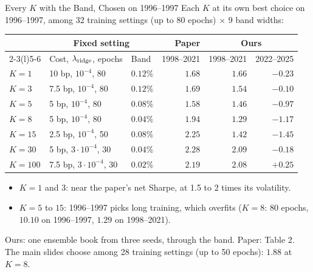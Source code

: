 \documentclass[11pt]{beamer}
\newcommand{\src}[1]{%
  \par\vfill
  {\fontsize{6.4}{7.6}\selectfont\color{Muted}#1\par}
}
\renewcommand{\src}[1]{%
  \par\vfill
  {\fontsize{6.4}{7.6}\selectfont#1\par}
}
\begin{document}
\begin{frame}{Every $K$ with the Band, Chosen on 1996--1997}
\small
Each $K$ at its own best choice on 1996--1997, among 32 training settings (up to 80 epochs) $\times$ 9 band widths:
\begin{center}
\setlength{\tabcolsep}{4pt}
\begin{tabular}{@{}lllrrr@{}}
\toprule
 & \multicolumn{2}{c}{Fixed setting} & Paper & \multicolumn{2}{c}{Ours}\\
\cmidrule(lr){2-3}\cmidrule(l){5-6}
 & Cost, $\lambda_{\rm ridge}$, epochs & Band & 1998--2021 & 1998--2021 & 2022--2025\\
\midrule
$K=1$ & 10 bp, $10^{-4}$, 80 & $0.12\%$ & $1.68$ & $1.66$ & $-0.23$\\
$K=3$ & 7.5 bp, $10^{-4}$, 80 & $0.12\%$ & $1.69$ & $1.54$ & $-0.10$\\
$K=5$ & 5 bp, $10^{-4}$, 80 & $0.08\%$ & $1.58$ & $1.46$ & $-0.97$\\
$K=8$ & 5 bp, $10^{-4}$, 80 & $0.04\%$ & $1.94$ & $1.29$ & $-1.17$\\
$K=15$ & 2.5 bp, $10^{-4}$, 50 & $0.08\%$ & $2.25$ & $1.42$ & $-1.45$\\
$K=30$ & 5 bp, $3\cdot10^{-4}$, 30 & $0.04\%$ & $2.28$ & $2.09$ & $-0.18$\\
$K=100$ & 7.5 bp, $3\cdot10^{-4}$, 30 & $0.02\%$ & $2.19$ & $2.08$ & $+0.25$\\
\bottomrule
\end{tabular}
\end{center}
\begin{itemize}
\item $K=1$ and $3$: near the paper's net Sharpe, at 1.5 to 2 times its volatility.
\item $K=5$ to $15$: 1996--1997 picks long training, which overfits ($K=8$: 80 epochs, $10.10$ on 1996--1997, $1.29$ on 1998--2021).
\end{itemize}
\src{Ours: one ensemble book from three seeds, through the band. Paper: Table 2. The main slides choose among 28 training settings (up to 50 epochs): $1.88$ at $K=8$.}
\end{frame}
\end{document}
